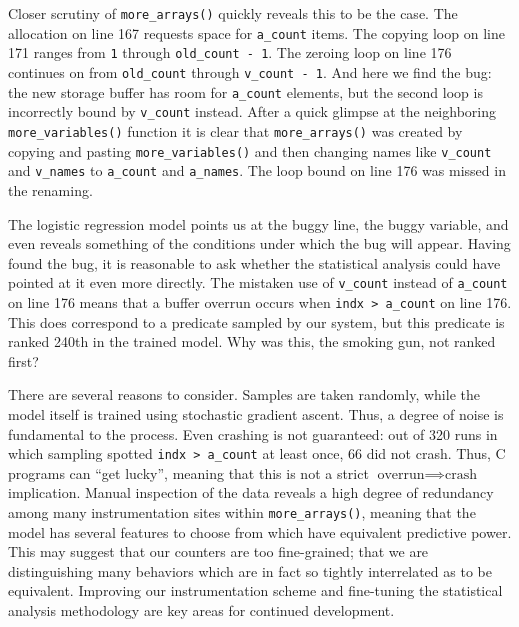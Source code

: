 Closer scrutiny of \texttt{more\_arrays()} quickly reveals this to be
the case.  The allocation on line 167 requests space for
\texttt{a\_count} items.  The copying loop on line 171 ranges from
\texttt{1} through \texttt{old\_count - 1}.  The zeroing loop on line
176 continues on from \texttt{old\_count} through \texttt{v\_count -
  1}.  And here we find the bug: the new storage buffer has room for
\texttt{a\_count} elements, but the second loop is incorrectly bound
by \texttt{v\_count} instead.  After a quick glimpse at the
neighboring \texttt{more\_variables()} function it is clear that
\texttt{more\_arrays()} was created by copying and pasting
\texttt{more\_variables()} and then changing names like
\texttt{v\_count} and \texttt{v\_names} to \texttt{a\_count} and
\texttt{a\_names}.  The loop bound on line 176 was missed in the
renaming.

The logistic regression model points us at the buggy line, the buggy
variable, and even reveals something of the conditions under which the
bug will appear.  Having found the bug, it is reasonable to ask
whether the statistical analysis could have pointed at it even more
directly.  The mistaken use of \texttt{v\_count} instead of
\texttt{a\_count} on line 176 means that a buffer overrun occurs when
\texttt{indx > a\_count} on line 176.  This does correspond to a
predicate sampled by our system, but this predicate is ranked 240th in
the trained model.  Why was this, the smoking gun, not ranked first?

There are several reasons to consider.  Samples are taken randomly,
while the model itself is trained using stochastic gradient ascent.
Thus, a degree of noise is fundamental to the process.  Even crashing
is not guaranteed: out of 320 runs in which sampling spotted
\texttt{indx > a\_count} at least once, 66 did not crash.  Thus, C
programs can ``get lucky'', meaning that this is not a strict
$\text{overrun} \implies \text{crash}$ implication.  Manual inspection
of the data reveals a high degree of redundancy among many
instrumentation sites within \texttt{more\_arrays()}, meaning that the
model has several features to choose from which have equivalent
predictive power.  This may suggest that our counters are too
fine-grained; that we are distinguishing many behaviors which are in
fact so tightly interrelated as to be equivalent.  Improving our
instrumentation scheme and fine-tuning the statistical analysis
methodology are key areas for continued development.


